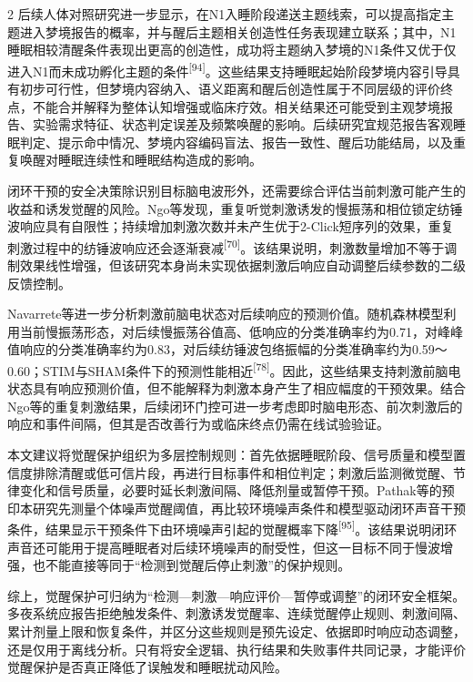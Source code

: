 \documentclass[UTF8,zihao=5,fontset=none]{ctexart}
\newcommand{\hei}{\CJKfamily{hei}}
\newcommand{\leveltwo}[1]{%
  \par\noindent{\hei\fontsize{10pt}{12pt}\selectfont\bfseries #1\par}}
\newcommand{\refcite}[1]{\nolinebreak[4]\textsuperscript{[#1]}}
\begin{document}
\begin{multicols}{2}
后续人体对照研究进一步显示，在N1入睡阶段递送主题线索，可以提高指定主题进入梦境报告的概率，并与醒后主题相关创造性任务表现建立联系；其中，N1睡眠相较清醒条件表现出更高的创造性，成功将主题纳入梦境的N1条件又优于仅进入N1而未成功孵化主题的条件\refcite{94}。这些结果支持睡眠起始阶段梦境内容引导具有初步可行性，但梦境内容纳入、语义距离和醒后创造性属于不同层级的评价终点，不能合并解释为整体认知增强或临床疗效。相关结果还可能受到主观梦境报告、实验需求特征、状态判定误差及频繁唤醒的影响。后续研究宜规范报告客观睡眠判定、提示命中情况、梦境内容编码盲法、报告一致性、醒后功能结局，以及重复唤醒对睡眠连续性和睡眠结构造成的影响。\par

\leveltwo{4.5 觉醒保护与干预时机自适应策略}

闭环干预的安全决策除识别目标脑电波形外，还需要综合评估当前刺激可能产生的收益和诱发觉醒的风险。Ngo等发现，重复听觉刺激诱发的慢振荡和相位锁定纺锤波响应具有自限性；持续增加刺激次数并未产生优于2-Click短序列的效果，重复刺激过程中的纺锤波响应还会逐渐衰减\refcite{70}。该结果说明，刺激数量增加不等于调制效果线性增强，但该研究本身尚未实现依据刺激后响应自动调整后续参数的二级反馈控制。\par

Navarrete等进一步分析刺激前脑电状态对后续响应的预测价值。随机森林模型利用当前慢振荡形态，对后续慢振荡谷值高、低响应的分类准确率约为0.71，对峰峰值响应的分类准确率约为0.83，对后续纺锤波包络振幅的分类准确率约为0.59～0.60；STIM与SHAM条件下的预测性能相近\refcite{78}。因此，这些结果支持刺激前脑电状态具有响应预测价值，但不能解释为刺激本身产生了相应幅度的干预效果。结合Ngo等的重复刺激结果，后续闭环门控可进一步考虑即时脑电形态、前次刺激后的响应和事件间隔，但其是否改善行为或临床终点仍需在线试验验证。\par

本文建议将觉醒保护组织为多层控制规则：首先依据睡眠阶段、信号质量和模型置信度排除清醒或低可信片段，再进行目标事件和相位判定；刺激后监测微觉醒、节律变化和信号质量，必要时延长刺激间隔、降低剂量或暂停干预。Pathak等的预印本研究先测量个体噪声觉醒阈值，再比较环境噪声条件和模型驱动闭环声音干预条件，结果显示干预条件下由环境噪声引起的觉醒概率下降\refcite{95}。该结果说明闭环声音还可能用于提高睡眠者对后续环境噪声的耐受性，但这一目标不同于慢波增强，也不能直接等同于“检测到觉醒后停止刺激”的保护规则。\par

综上，觉醒保护可归纳为“检测—刺激—响应评价—暂停或调整”的闭环安全框架。多夜系统应报告拒绝触发条件、刺激诱发觉醒率、连续觉醒停止规则、刺激间隔、累计剂量上限和恢复条件，并区分这些规则是预先设定、依据即时响应动态调整，还是仅用于离线分析。只有将安全逻辑、执行结果和失败事件共同记录，才能评价觉醒保护是否真正降低了误触发和睡眠扰动风险。\par


\end{multicols}
\end{document}
